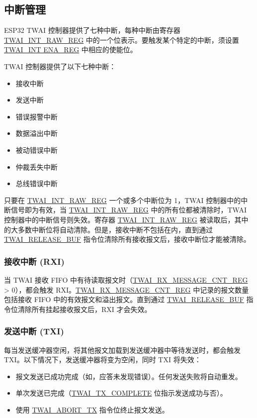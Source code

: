 \documentclass[main\_\_CN.tex]{subfiles}
\begin{document}
\subsection{中断管理}
\label{subsubsec:interrupt-management}
ESP32 TWAI 控制器提供了七种中断，每种中断由寄存器 \hyperref[regdesc:TWAIINTRAWREG]{TWAI\_INT\_RAW\_REG} 中的一个位表示。要触发某个特定的中断，须设置 \hyperref[regdesc:TWAIINT ENAREG]{TWAI\_INT ENA\_REG} 中相应的使能位。

TWAI 控制器提供了以下七种中断：

\begin{itemize}
    \item 接收中断
    \item 发送中断
    \item 错误报警中断
    \item 数据溢出中断
    \item 被动错误中断
    \item 仲裁丢失中断
    \item 总线错误中断
\end{itemize}

只要在 \hyperref[regdesc:TWAIINTRAWREG]{TWAI\_INT\_RAW\_REG} 一个或多个中断位为 1，TWAI 控制器中的中断信号即为有效，当 \hyperref[regdesc:TWAIINTRAWREG]{TWAI\_INT\_RAW\_REG} 中的所有位都被清除时，TWAI 控制器中的中断信号则失效。寄存器 \hyperref[regdesc:TWAIINTRAWREG]{TWAI\_INT\_RAW\_REG} 被读取后，其中的大多数中断位将自动清除。但是，接收中断不包括在内，直到通过 \hyperref[fielddesc:TWAIRELEASEBUF]{TWAI\_RELEASE\_BUF} 指令位清除所有接收报文后，接收中断位才能被清除。

\subsubsection{接收中断 (RXI)}
当 TWAI 接收 FIFO 中有待读取报文时（\hyperref[regdesc:TWAIRXMESSAGECNTREG]{TWAI\_RX\_MESSAGE\_CNT\_REG} > 0），都会触发 RXI。\hyperref[regdesc:TWAIRXMESSAGECNTREG]{TWAI\_RX\_MESSAGE\_CNT\_REG} 中记录的报文数量包括接收 FIFO 中的有效报文和溢出报文。直到通过 \hyperref[fielddesc:TWAIRELEASEBUF]{TWAI\_RELEASE\_BUF} 指令位清除所有挂起接收报文后，RXI 才会失效。

\subsubsection{发送中断 (TXI)}
每当发送缓冲器空闲，将其他报文加载到发送缓冲器中等待发送时，都会触发 TXI。以下情况下，发送缓冲器将变为空闲，同时 TXI 将失效：

\begin{itemize}
    \item 报文发送已成功完成（如，应答未发现错误）。任何发送失败将自动重发。
    \item 单次发送已完成（\hyperref[fielddesc:TWAITXCOMPLETE]{TWAI\_TX\_COMPLETE} 位指示发送成功与否）。
    \item 使用 \hyperref[fielddesc:TWAIABORTTX]{TWAI\_ABORT\_TX} 指令位终止报文发送。
\end{itemize}
\end{document}
